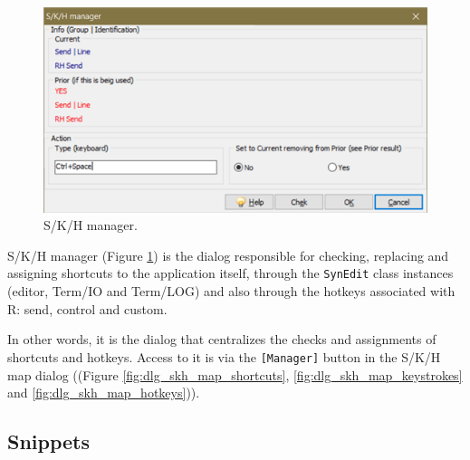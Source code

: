 \begin{figure}[H]
  \begin{center}
    \includegraphics[scale=0.60]{./res/dlg_skh_manager.png}
  \end{center}
  \caption{S/K/H manager.}
  \label{fig:dlg_skh_manager}
\end{figure}
S/K/H manager
(Figure \ref{fig:dlg_skh_manager})
is the dialog responsible for checking, replacing and assigning shortcuts to the application itself,
through the \texttt{SynEdit} class instances (editor, Term/IO and Term/LOG) and also through the hotkeys
associated with R: send, control and custom.

In other words, it is the dialog that centralizes the checks and assignments of shortcuts and hotkeys.
Access to it is via the \texttt{[Manager]} button in the S/K/H map dialog
((Figure \ref{fig:dlg_skh_map_shortcuts},
         \ref{fig:dlg_skh_map_keystrokes} and
         \ref{fig:dlg_skh_map_hotkeys})).

\hypertarget{snippets}{}
\subsection{Snippets}

